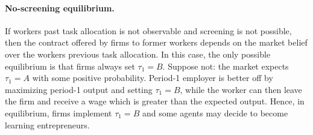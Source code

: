 \documentclass[12pt,american]{paper}
\theoremstyle{remark}
\begin{document}


\paragraph*{No-screening equilibrium.}

If workers past task allocation is not observable and screening is not possible, then the contract offered by firms to former workers depends on the market belief over the workers previous task allocation. In this case, the only possible equilibrium is that firms always set $\tau_1=B$. Suppose not: the market expects $\tau_1=A$ with some positive probability. Period-1 employer is better off by maximizing period-1 output and setting  $\tau_1=B$, while the worker can then leave the firm and receive a  wage which is greater than the expected output. Hence, in equilibrium, firms implement $\tau_1=B$ and some agents may decide to become learning entrepreneurs. %
\end{document}

